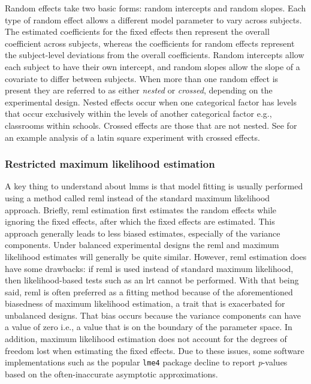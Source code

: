 \documentclass{report}
\begin{document}
Random effects take two basic forms: random intercepts and random slopes. Each type of random effect allows a different model parameter to vary across subjects. The estimated coefficients for the fixed effects then represent the overall coefficient across subjects, whereas the coefficients for random effects represent the subject-level deviations from the overall coefficients. Random intercepts allow each subject to have their own intercept, and random slopes allow the slope of a covariate to differ between subjects. When more than one random effect is present they are referred to as either \textit{nested} or \textit{crossed}, depending on the experimental design. Nested effects occur when one categorical factor has levels that occur exclusively within the levels of another categorical factor e.g., classrooms within schools. Crossed effects are those that are not nested. See \cite[Chapter~10.9]{faraway_extending_2016} for an example analysis of a latin square experiment with crossed effects. 

\subsubsection{Restricted maximum likelihood estimation}

A key thing to understand about \glspl{lmm} is that model fitting is usually performed using a method called \gls{reml} instead of the standard maximum likelihood approach. Briefly, \gls{reml} estimation first estimates the random effects while ignoring the fixed effects, after which the fixed effects are estimated. This approach generally leads to less biased estimates, especially of the variance components. Under balanced experimental designs the \gls{reml} and maximum likelihood estimates will generally be quite similar. However, \gls{reml} estimation does have some drawbacks: if \gls{reml} is used instead of standard maximum likelihood, then likelihood-based tests such as an \gls{lrt} cannot be performed. With that being said, \gls{reml} is often preferred as a fitting method because of the aforementioned biasedness of maximum likelihood estimation, a trait that is exacerbated for unbalanced designs. That bias occurs because the variance components can have a value of zero i.e., a value that is on the boundary of the parameter space. In addition, maximum likelihood estimation does not account for the degrees of freedom lost when estimating the fixed effects. Due to these issues, some software implementations such as the popular \texttt{lme4} package decline to report \textit{p}-values based on the often-inaccurate asymptotic approximations. 
\end{document}
